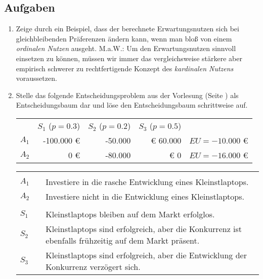 \subsection{Aufgaben}
\begin{enumerate}
  
  \item Zeige durch ein Beispiel, dass der berechnete Erwartungsnutzen
  sich bei gleichbleibenden Präferenzen ändern kann, wenn man bloß von einem
  {\em ordinalen Nutzen} ausgeht. M.a.W.: Um den Erwartungsnutzen sinnvoll
  einsetzen zu können, müssen wir immer das vergleichsweise stärkere aber
  empirisch schwerer zu rechtfertigende Konzept des {\em kardinalen Nutzens}
  voraussetzen.
  
  \item Stelle das folgende Entscheidungsproblem aus der Vorlesung (Seite
  \pageref{RisikoBeispiel1}) als Entscheidungsbaum dar und löse den
  Entscheidungsbaum schrittweise auf.

\begin{center}
\begin{tabular}{c|r|r|r|r}
\multicolumn{1}{c}{}  & \multicolumn{1}{c}{$S_1$ ($p=0.3$)}  &
\multicolumn{1}{c}{$S_2$ ($p=0.2$)} & \multicolumn{1}{c}{$S_3$ ($p=0.5$)} \\
\cline{2-4} $A_1$ & -100.000 € & -50.000 & € 60.000 & $EU = -10.000$ €\\ 
\cline{2-4} $A_2$ & 0 €        & -80.000 & € 0      & $EU = -16.000$ €\\ 
\cline{2-4}
\end{tabular}
\begin{small}
\begin{tabular}{llp{10cm}}
& & \\
$A_1$ & & Investiere in die rasche Entwicklung eines Kleinstlaptops.\\
$A_2$ & & Investiere nicht in die Entwicklung eines Kleinstlaptops.\\
& &\\
$S_1$ & & Kleinstlaptops bleiben auf dem Markt erfolglos.\\
$S_2$ & & Kleinstlaptops sind erfolgreich, aber die Konkurrenz
                   ist ebenfalls frühzeitig auf dem Markt präsent.\\
$S_3$ & & Kleinstlaptops sind erfolgreich, aber die Entwicklung 
                   der Konkurrenz verzögert sich. \\
\end{tabular}
\end{small}
\end{center}
  

\end{enumerate}
